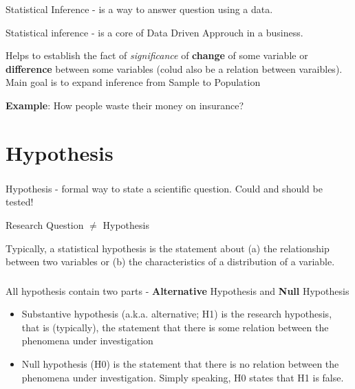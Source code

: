 \documentclass[t, 11pt]{beamer}
\newcommand\Warning{%
	\makebox[1.4em][c]{%
		\makebox[0pt][c]{\raisebox{.1em}{\small!}}%
		\makebox[0pt][c]{\color{red}\Large$\bigtriangleup$}}}%
\begin{document}
	\begin{frame}
		\frametitle{\insertsection} 
		\framesubtitle{\insertsubsection} 
	
		Statistical Inference - is a way to answer question using a data. 
		
		Statistical inference - is a core of Data Driven Approuch in a business. 
		
		\vspace{1cm}
		
		\Warning Helps to establish the fact of \emph{significance} of \textbf{change} of some variable or \textbf{difference} between some variables (colud also be a relation between varaibles). Main goal is to expand inference from Sample to Population
		\vspace{1cm}
		
		\textbf{Example}: How people waste their money on insurance?
		
	\end{frame}		

	
	\section{Hypothesis} 
	\begin{frame}
		\frametitle{\insertsection} 
		\framesubtitle{\insertsubsection} 
		
		
			Hypothesis - formal way to state a scientific question. Could and should be tested! 			
			
			\vspace{1cm}
			
			\Warning Research Question $\neq$ Hypothesis 
			
			\vspace{1cm}
			
			Typically, a statistical hypothesis is the statement about (a) the relationship between two variables or (b) the characteristics of a distribution of a variable.
			
	
	\end{frame}		

	\begin{frame}
	\frametitle{\insertsection} 
	\framesubtitle{\insertsubsection} 
	
 		All hypothesis contain two parts - \textbf{Alternative} Hypothesis and \textbf{Null} Hypothesis 
 		
 	\vspace{1cm}
 	
 	\begin{itemize}
 		\item Substantive hypothesis (a.k.a. alternative; H1) is the research hypothesis, that is (typically), the statement that there is some relation between the phenomena under investigation
 		 \item Null hypothesis (H0) is the statement that there is no relation between the phenomena under investigation. Simply speaking, H0 states that H1 is false.
	\end{itemize}
	
	\end{frame}		
\end{document}
